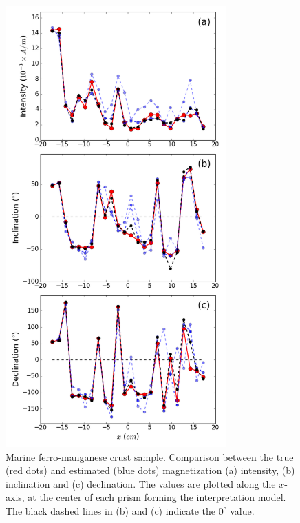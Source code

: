 \documentclass[draft,gc]{agutex}
\begin{document}
 \begin{figure}
 \noindent \includegraphics[width=20pc]{Figs/Fig12_LQ.png}
 \caption{Marine ferro-manganese crust sample. Comparison between the true (red dots)
 and estimated (blue dots) magnetization (a) intensity, (b) inclination 
 and (c) declination.
 The values are plotted along the $x$-axis, at the center of each 
 prism forming the interpretation model.
 The black dashed lines in (b) and (c) indicate the $0^{\circ}$ value.}
 \label{fig:estimate-oda}
 \end{figure}
\end{document}
